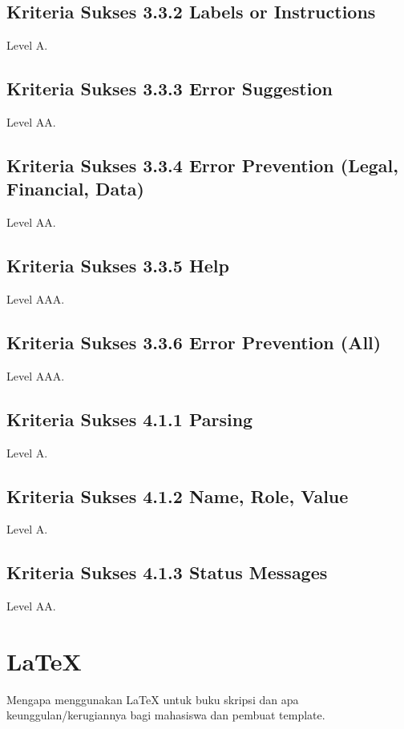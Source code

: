 {\subsection{Kriteria Sukses 3.3.2 Labels or Instructions}
\label{sec:kriteria_3.3.2}
Level A.

\subsection{Kriteria Sukses 3.3.3 Error Suggestion}
\label{sec:kriteria_3.3.3}
Level AA.

\subsection{Kriteria Sukses 3.3.4 Error Prevention (Legal, Financial, Data)}
\label{sec:kriteria_3.3.4}
Level AA.

\subsection{Kriteria Sukses 3.3.5 Help}
\label{sec:kriteria_3.3.5}
Level AAA.

\subsection{Kriteria Sukses 3.3.6 Error Prevention (All)}
\label{sec:kriteria_3.3.6}
Level AAA.

\subsection{Kriteria Sukses 4.1.1 Parsing}
\label{sec:kriteria_4.1.1}
Level A.

\subsection{Kriteria Sukses 4.1.2 Name, Role, Value}
\label{sec:kriteria_4.1.2}
Level A.

\subsection{Kriteria Sukses 4.1.3 Status Messages}
\label{sec:kriteria_4.1.3}
Level AA.

\section{\LaTeX}
\label{sec:latex}

Mengapa menggunakan \LaTeX{} untuk buku skripsi dan apa keunggulan/kerugiannya bagi mahasiswa dan pembuat template. 

}
